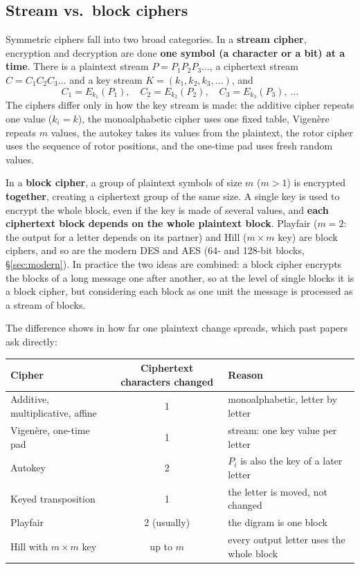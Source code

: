 \subsection{Stream vs.\ block ciphers}
Symmetric ciphers fall into two broad categories. In a \textbf{stream cipher}, encryption and decryption are done \textbf{one symbol (a character or a bit) at a time}. There is a plaintext stream $P = P_1P_2P_3\dots$, a ciphertext stream $C = C_1C_2C_3\dots$ and a key stream $K = (k_1, k_2, k_3, \dots)$, and
\[
C_1 = E_{k_1}(P_1),\quad C_2 = E_{k_2}(P_2),\quad C_3 = E_{k_3}(P_3),\ \dots
\]
The ciphers differ only in how the key stream is made: the additive cipher repeats one value ($k_i = k$), the monoalphabetic cipher uses one fixed table, Vigen\`ere repeats $m$ values, the autokey takes its values from the plaintext, the rotor cipher uses the sequence of rotor positions, and the one-time pad uses fresh random values.

In a \textbf{block cipher}, a group of plaintext symbols of size $m$ ($m > 1$) is encrypted \textbf{together}, creating a ciphertext group of the same size. A single key is used to encrypt the whole block, even if the key is made of several values, and \textbf{each ciphertext block depends on the whole plaintext block}. Playfair ($m = 2$: the output for a letter depends on its partner) and Hill ($m \times m$ key) are block ciphers, and so are the modern DES and AES (64- and 128-bit blocks, \S\ref{sec:modern}). In practice the two ideas are combined: a block cipher encrypts the blocks of a long message one after another, so at the level of single blocks it is a block cipher, but considering each block as one unit the message is processed as a stream of blocks.

The difference shows in how far one plaintext change spreads, which past papers ask directly:
\begin{center}\small
\begin{tabular}{@{}lcl@{}}
\toprule
Cipher & Ciphertext characters changed & Reason\\
\midrule
Additive, multiplicative, affine & 1 & monoalphabetic, letter by letter\\
Vigen\`ere, one-time pad & 1 & stream: one key value per letter\\
Autokey & 2 & $P_i$ is also the key of a later letter\\
Keyed transposition & 1 & the letter is moved, not changed\\
Playfair & 2 (usually) & the digram is one block\\
Hill with $m \times m$ key & up to $m$ & every output letter uses the whole block\\
\bottomrule
\end{tabular}
\end{center}

